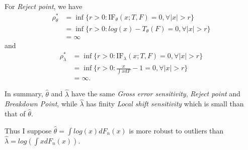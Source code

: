 \begin{solution}
    For \emph{Reject point}, we have
    \begin{equation*}
        \begin{split}
            \rho^*_\theta  & = \inf \{r>0: \text{IF}_\theta (x;T,F)=0, \forall |x| >r \} \\
            & =  \inf \{r>0: log(x)-T_\theta(F)=0, \forall |x| >r \} \\
            & = \infty
        \end{split}
    \end{equation*}
    and
    \begin{equation*}
        \begin{split}
            \rho^*_\lambda  & = \inf \{r>0: \text{IF}_\lambda (x;T,F)=0, \forall |x| >r \} \\
            & = \inf \{r>0:\frac{x}{\int x dF} -1=0, \forall |x| >r \} \\
            & = \infty.
        \end{split}
    \end{equation*}

    In summary, $\hat{\theta}$ and $\hat{\lambda}$ have the same \emph{Gross error sensitivity},  \emph{Reject point} and \emph{Breakdown Point}, while $\hat{\lambda}$ has finity \emph{Local shift sensitivity} which is small than that of $\hat{\theta}$. 

    Thus I suppose $\hat{\theta}= \int log(x) d F_n(x)$ is more robust to outliers than $\hat{\lambda} = log \left( \int  x d F_n(x) \right)$.
\end{solution}
